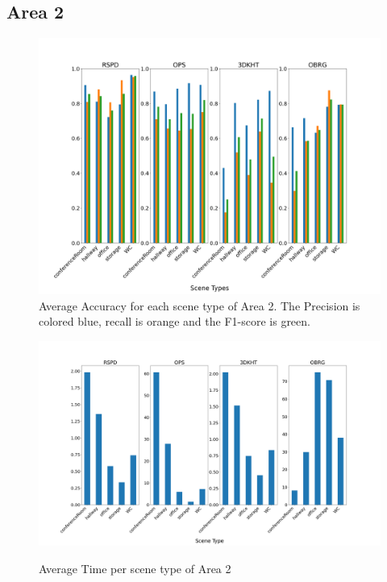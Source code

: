 \documentclass[main.tex]{subfiles}
\begin{document}
\subsection{Area 2}

\begin{figure}[H]
    \centering
    \includegraphics[width=15 cm]{images/area_2_acc.png}
    \caption[Accuracies Area 3]{Average Accuracy for each scene type of Area 2. The Precision
    is colored blue, recall is orange and the F1-score is green. }
    \label{fig:area2A}
\end{figure}

\begin{figure}[H]
    \centering
    \includegraphics[width=15 cm]{images/area_2_time.png}
    \label{fig:area2T}
    \caption[Times Area 2]{Average Time per scene type of Area 2}
\end{figure}
\end{document}
